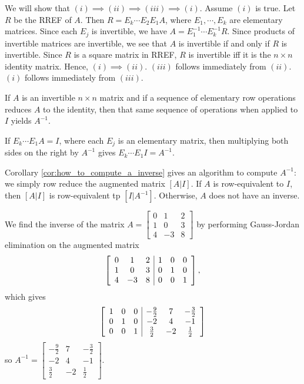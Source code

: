 \documentclass[12pt,letterpaper,reqno]{article}
\numberwithin{equation}{section}
\begin{document}
\begin{pf}
We will show that $(i) \implies (ii) \implies (iii) \implies (i)$. Assume $(i)$ is true. Let $R$ be the RREF of $A$. Then $R=E_k\cdots E_2 E_1 A$, where $E_1,\cdots,E_k$ are elementary matrices. Since each $E_j$ is invertible, we have $A=E_1^{-1} \cdots E_k^{-1}R$. Since products of invertible matrices are invertible, we see that $A$ is invertible if and only if $R$ is invertible. Since $R$ is a square matrix in RREF, $R$ is invertible iff it is the $n \times n$ identity matrix. Hence, $(i) \implies (ii)$. $(iii)$ follows immediately from $(ii)$. $(i)$ follows immediately from $(iii)$.	
\end{pf}

\begin{cor}\label{cor:how_to_compute_a_inverse}
If $A$ is an invertible $n \times n$ matrix and if a sequence of elementary row operations reduces $A$ to the identity, then that same sequence of operations when applied to $I$ yields $A^{-1}$.	
\end{cor}

\begin{pf}
If $E_k \cdots E_1 A=I$, where each $E_j$ is an elementary matrix, then multiplying both sides on the right by $A^{-1}$ gives $E_k \cdots E_1 I=A^{-1}$.	
\end{pf}

Corollary \ref{cor:how_to_compute_a_inverse} gives an algorithm to compute $A^{-1}$: we simply row reduce the augmented matrix $[A|I]$. If $A$ is row-equivalent to $I$, then $[A|I]$ is row-equivalent tp $[I|A^{-1}]$. Otherwise, $A$ does not have an inverse.

\begin{example}
We find the inverse of the matrix $A=\begin{bmatrix}
	0&1&2 \\ 1&0&3 \\ 4&-3&8
\end{bmatrix}$ by performing Gauss-Jordan elimination on the augmented matrix
\begin{align*}
\left[	\begin{array}{c c c | c c c}
		0 & 1 & 2 & 1 & 0 & 0 \\
		1 & 0 &3 & 0 & 1 & 0 \\
		4 & -3 & 8 & 0 & 0 & 1
	\end{array}\right],
\end{align*} which gives \begin{align*}
\left[	\begin{array}{c c c | c c c}
		1 & 0 & 0 & -\frac{9}{2} & 7 & -\frac{3}{2} \\
		0 & 1 & 0 & -2 & 4 & -1 \\
		0 & 0 & 1 & \frac{3}{2} & -2 & \frac{1}{2} 
	\end{array}\right]
\end{align*}
so $A^{-1}=\begin{bmatrix}
	-\frac{9}{2} & 7 & -\frac{3}{2} \\
	-2 & 4 & -1 \\
	\frac{3}{2} & -2 & \frac{1}{2}
\end{bmatrix}$.	
\end{example}
\end{document}
